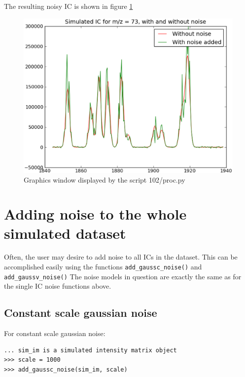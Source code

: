 The resulting noisy IC is shown in figure \ref{fig:gaussv-noise-ic}


\begin{figure}[h]
  \begin{center}
    \includegraphics[scale=0.25]{graphics/chapter10/test-102.eps}
  \end{center}
  \caption{Graphics window displayed by the script 102/proc.py}
  \label{fig:gaussv-noise-ic}
\end{figure}



\section{{Adding noise to the whole simulated dataset}}


Often, the user may desire to add noise to all ICs in the dataset. This can be 
accomplished easily using the functions {\tt add\_gaussc\_noise()} and {\tt add\_gaussv\_noise()}
The noise models in question are exactly the same as for the single IC noise functions above.

\subsection{Constant scale gaussian noise}

For constant scale gaussian noise:

\begin{verbatim}
... sim_im is a simulated intensity matrix object
>>> scale = 1000
>>> add_gaussc_noise(sim_im, scale)
\end{verbatim}

